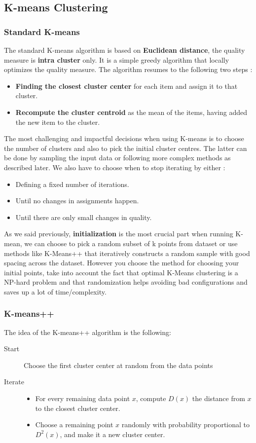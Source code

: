 \subsection{K-means Clustering}

\subsubsection{Standard K-means}

The standard K-means algorithm is based on \textbf{Euclidean distance}, the quality measure is \textbf{intra cluster} only. It is a simple greedy algorithm that locally optimizes the quality measure. The algorithm resumes to the following two steps :
\begin{itemize}
	\item \textbf{Finding the closest cluster center} for each item and assign it to that cluster.
	\item \textbf{Recompute the cluster centroid} as the mean of the items, having added the new item to the cluster.
\end{itemize}
The most challenging and impactful decisions when using K-means is to choose the number of clusters and also to pick the initial cluster centres. The latter can be done by sampling the input data or following more complex methods as described later. We also have to choose when to stop iterating by either :
\begin{itemize}
	\item Defining a fixed number of iterations.
	\item Until no changes in assignments happen.
	\item Until there are only small changes in quality.
\end{itemize}
As we said previously, \textbf{initialization} is the most crucial part when running K-mean, we can choose to pick a random subset of k points from dataset or use methods like K-Means++ that iteratively constructs a random sample with good spacing across the dataset. However you choose the method for choosing your initial points, take into account the fact that optimal K-Means clustering is a NP-hard problem and that randomization helps avoiding bad configurations and saves up a lot of time/complexity.

\subsubsection{K-means++}
The idea of the K-means++ algorithm is the following:
\begin{description}
 \item[Start] Choose the first cluster center at random from the data points
 \item[Iterate] 
 \begin{itemize}
  \item For every remaining data point $x$, compute $D(x)$ the distance from $x$ to the closest cluster center.
  \item Choose a remaining point $x$ randomly with probability proportional to $D^2(x)$, and make it a new cluster center.
 \end{itemize}
\end{description}


